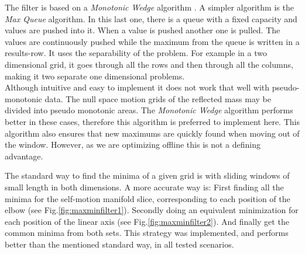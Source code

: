 The filter is based on a \textit{Monotonic Wedge} algorithm \cite{Lemire}.
A simpler algorithm is the \textit{Max Queue} algorithm. In this last one, there is a queue with a fixed capacity and values are pushed into it. When a value is pushed another one is pulled. The values are continuously pushed while the maximum from the queue is written in a results-row.
It uses the separability of the problem.  For example in a two dimensional grid, it goes through all the rows and then through all the columns, making it two separate one dimensional problems.\\
%
Although intuitive and easy to implement it does not work that well with pseudo-monotonic data. The null space motion grids of the reflected mass may be divided into pseudo monotonic areas. The \textit{Monotonic Wedge} algorithm performs better in these cases, therefore this algorithm is preferred to implement here. This algorithm also ensures that new maximums are quickly found when moving out of the window. However, as we are optimizing offline this is not a defining advantage.






The standard way to find the minima of a given grid is with sliding windows of small length in both dimensions. A more accurate way is: First finding all the minima for the self-motion manifold slice, corresponding to each position of the elbow (see Fig.\ref{fig:maxminfilter1}). Secondly doing an equivalent minimization for each position of the linear axis (see Fig.\ref{fig:maxminfilter2}). 
And finally get the common minima from both sets. This strategy was implemented, and performs better than the mentioned standard way, in all tested scenarios. 


